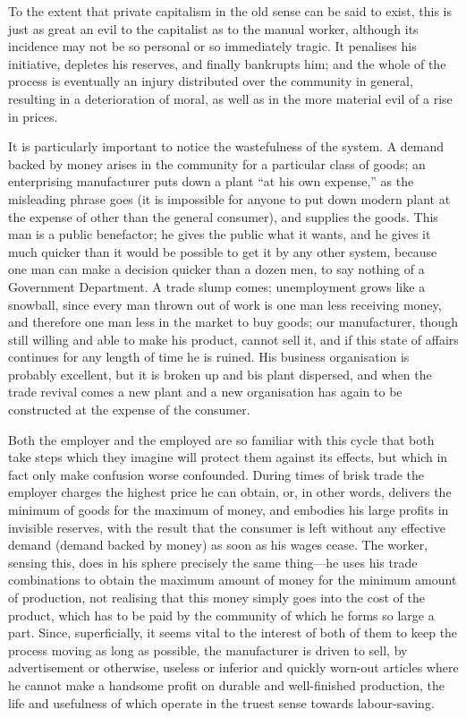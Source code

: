 \documentclass{book}
\begin{document}
To the extent that private capitalism in the old sense can be said to exist, this is just as great an evil to the capitalist as to the manual worker, although its incidence may not be so personal or so immediately tragic. It penalises his initiative, depletes his reserves, and finally bankrupts him; and the whole of the process is eventually an injury distributed over the community in general, resulting in a deterioration of moral, as well as in the more material evil of a rise in prices.

It is particularly important to notice the wastefulness of the system. A demand backed by money arises in the community for a particular class of goods; an enterprising manufacturer puts down a plant “at his own expense,” as the misleading phrase goes (it is impossible for anyone to put down modern plant at the expense of other than the general consumer), and supplies the goods. This man is a public benefactor; he gives the public what it wants, and he gives it much quicker than it would be possible to get it by any other system, because one man can make a decision quicker than a dozen men, to say nothing of a Government Department. A trade slump comes; unemployment grows like a snowball, since every man thrown out of work is one man less receiving money, and therefore one man less in the market to buy goods; our manufacturer, though still willing and able to make his product, cannot sell it, and if this state of affairs continues for any length of time he is ruined. His business organisation is probably excellent, but it is broken up and bis plant dispersed, and when the trade revival comes a new plant and a new organisation has again to be constructed at the expense of the consumer.

Both the employer and the employed are so familiar with this cycle that both take steps which they imagine will protect them against its effects, but which in fact only make confusion worse confounded. During times of brisk trade the employer charges the highest price he can obtain, or, in other words, delivers the minimum of goods for the maximum of money, and embodies his large profits in invisible reserves, with the result that the consumer is left without any effective demand (demand backed by money) as soon as his wages cease. The worker, sensing this, does in his sphere precisely the same thing—he uses his trade combinations to obtain the maximum amount of money for the minimum amount of production, not realising that this money simply goes into the cost of the product, which has to be paid by the community of which he forms so large a part. Since, superficially, it seems vital to the interest of both of them to keep the process moving as long as possible, the manufacturer is driven to sell, by advertisement or otherwise, useless or inferior and quickly worn-out articles where he cannot make a handsome profit on durable and well-finished production, the life and usefulness of which operate in the truest sense towards labour-saving.
\end{document}
